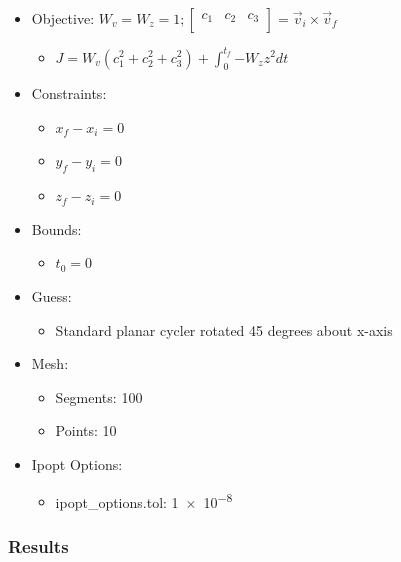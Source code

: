 \documentclass{article}
\begin{document}
\begin{itemize}
    \item Objective: $W_v = W_z = 1; \left[\begin{matrix}c_1&c_2&c_3\\\end{matrix}\right] = \vec{v}_i\times\vec{v}_f$
    \begin{itemize}
        \item $J = W_v\left(c_1^2 + c_2^2 + c_3^2\right) + \int_{0}^{t_f}{-W_zz^2dt}$
    \end{itemize}
    \item Constraints:
    \begin{itemize}
        \item $x_f - x_i = 0$
        \item $y_f - y_i = 0$
        \item $z_f - z_i = 0$
    \end{itemize}
    \item Bounds:
    \begin{itemize}
        \item $t_0 = 0$
    \end{itemize}
    \item Guess:
    \begin{itemize}
        \item Standard planar cycler rotated 45 degrees about x-axis
    \end{itemize}
    \item Mesh:
    \begin{itemize}
        \item Segments: 100
        \item Points: 10
    \end{itemize}
    \item Ipopt Options:
    \begin{itemize}
        \item ipopt\_options.tol: \num{1e-8}
    \end{itemize}
\end{itemize}

\subsubsection{Results}
\end{document}
